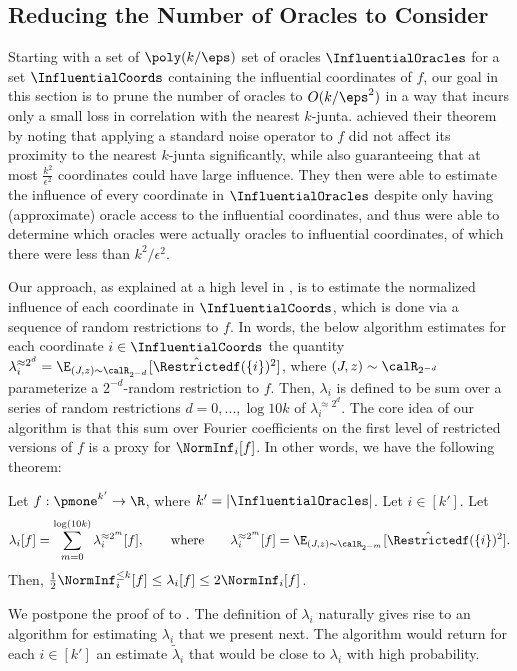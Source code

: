 \subsection{Reducing the Number of Oracles to Consider}

Starting with a set of $\poly(k/\eps)$ set of oracles $\InfluentialOracles$ for a set $\InfluentialCoords$ containing the influential coordinates of $f$,
our goal in this section is to prune the number of oracles to $O(k/\eps^2)$ in a way that incurs only a small loss in correlation with the nearest $k$-junta. 
\cite{junta-coordinate-oracles} achieved their theorem by noting that applying a standard noise operator to $f$ did not affect its proximity to the nearest $k$-junta significantly, while also guaranteeing that at most $\frac{k^2}{\epsilon^2}$ coordinates could have large influence. They then were able to estimate the influence of every coordinate in $\InfluentialOracles$ despite only having (approximate) oracle access to the influential coordinates, and thus were able to determine which oracles were actually oracles to influential coordinates, of which there were less than $k^2/\epsilon^2$.

Our approach, as explained at a high level in , is to estimate the normalized influence of each coordinate in $\InfluentialCoords$, which is done via a sequence of random restrictions to $f$.
In words, the below algorithm estimates for each coordinate $i \in \InfluentialCoords$ the quantity $\lambda_i^{\approx 2^d} =\E_{(J,z)\sim \calR_{2^{-d}}}[ \hat{\Restrictedf}(\{i\})^2]$,
where $(J,z) \sim \calR_{2^{-d}}$ parameterize a $2^{-d}$-random restriction to $f$. Then, $\lambda_i$ is defined to be sum over a series of random restrictions $d=0,...,\log 10k$ of $\lambda_i^{\approx 2^d}$. The core idea of our algorithm is that this sum over Fourier coefficients on the first level of restricted versions of $f$ is a proxy for $\NormInf_i[f]$. In other words, we have the following theorem:
\begin{theorem}
\label{theorem:ninf-ub-lb}
Let $f: \pmone^{{k'}} \to \R$, where ${k'} = |\InfluentialOracles|$.
Let $i \in [{k'}]$.
Let 
$$\lambda_i[f] = \sum_{m=0}^{\log(10k)} \lambda_i^{\approx 2^{m}}[f],
\qquad \text{where}\qquad 
\lambda_i^{\approx 2^{m}}[f] = 
 \E_{(J,z) \sim \calR_{2^{-m}}}[\hat{\Restrictedf}(\{i\})^2].$$
Then, $\frac{1}{2}\NormInf_i^{\leq k}[f] \le \lambda_i[f] \le 2 \NormInf_i[f]$.
\end{theorem}

We postpone the proof of  to .
The definition of $\lambda_i$ naturally gives rise to an algorithm for estimating $\lambda_i$ that we present next. The algorithm would return for each $i \in [{k'}]$ an estimate $\tilde{\lambda}_{i}$ that would be close to $\lambda_i$ with high probability. 

